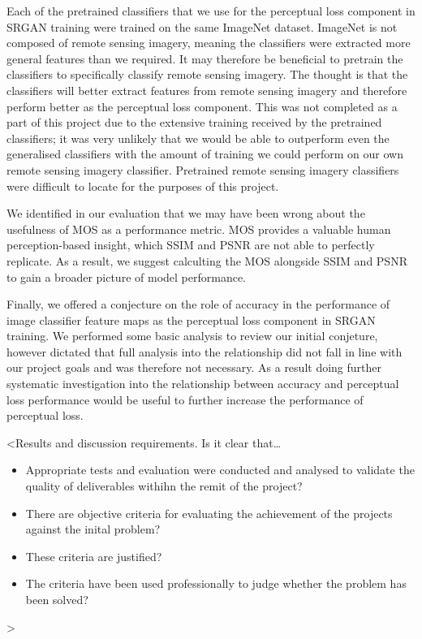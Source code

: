 Each of the pretrained classifiers that we use for the perceptual loss component in SRGAN training were trained on the same ImageNet dataset. ImageNet is not composed of remote sensing imagery, meaning the classifiers were extracted more general features than we required. It may therefore be beneficial to pretrain the classifiers to specifically classify remote sensing imagery. The thought is that the classifiers will better extract features from remote sensing imagery and therefore perform better as the perceptual loss component. This was not completed as a part of this project due to the extensive training received by the pretrained classifiers; it was very unlikely that we would be able to outperform even the generalised classifiers with the amount of training we could perform on our own remote sensing imagery classifier. Pretrained remote sensing imagery classifiers were difficult to locate for the purposes of this project.

We identified in our evaluation that we may have been wrong about the usefulness of MOS as a performance metric. MOS provides a valuable human perception-based insight, which SSIM and PSNR are not able to perfectly replicate. As a result, we suggest calculting the MOS alongside SSIM and PSNR to gain a broader picture of model performance.

Finally, we offered a conjecture on the role of accuracy in the performance of image classifier feature maps as the perceptual loss component in SRGAN training. We performed some basic analysis to review our initial conjeture, however dictated that full analysis into the relationship did not fall in line with our project goals and was therefore not necessary. As a result doing further systematic investigation into the relationship between accuracy and perceptual loss performance would be useful to further increase the performance of perceptual loss.

<Results and discussion requirements. Is it clear that\dots
\begin{itemize}
    \item Appropriate tests and evaluation were conducted and analysed to validate the quality of deliverables withihn the remit of the project?
    \item There are objective criteria for evaluating the achievement of the projects against the inital problem?
    \item These criteria are justified?
    \item The criteria have been used professionally to judge whether the problem has been solved?
\end{itemize}
>